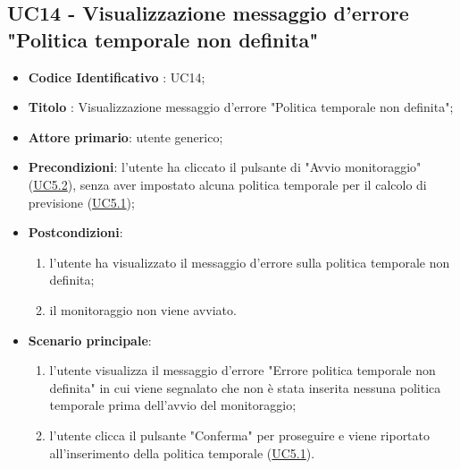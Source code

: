 	\subsection{UC14 - Visualizzazione messaggio d'errore "Politica temporale non definita"}
		\begin{itemize}
			\item\textbf{Codice Identificativo} : UC14;
			\item\textbf{Titolo} : Visualizzazione messaggio d'errore "Politica temporale non definita";
			\item\textbf{Attore primario}: utente generico;
			\item\textbf{Precondizioni}: l'utente ha cliccato il pulsante di "Avvio monitoraggio" (\hyperref[par:UC5.2]{UC5.2}), senza aver impostato alcuna politica temporale per il calcolo di previsione (\hyperref[par:UC5.1]{UC5.1});
			\item\textbf{Postcondizioni}:
				\begin{enumerate}
					\item l'utente ha visualizzato il messaggio d'errore sulla politica temporale non definita;		
					\item	il monitoraggio non viene avviato.
				\end{enumerate}
			\item\textbf{Scenario principale}:
				\begin{enumerate}
					\item l'utente visualizza il messaggio d'errore "Errore politica temporale non definita" in cui viene segnalato che non è stata inserita nessuna politica temporale prima dell'avvio del monitoraggio;
					\item l'utente clicca il pulsante "Conferma" per proseguire e viene riportato all'inserimento della politica temporale (\hyperref[par:UC5.1]{UC5.1}).		
				\end{enumerate}		
		\end{itemize}

	
		\label{par:UC15}
